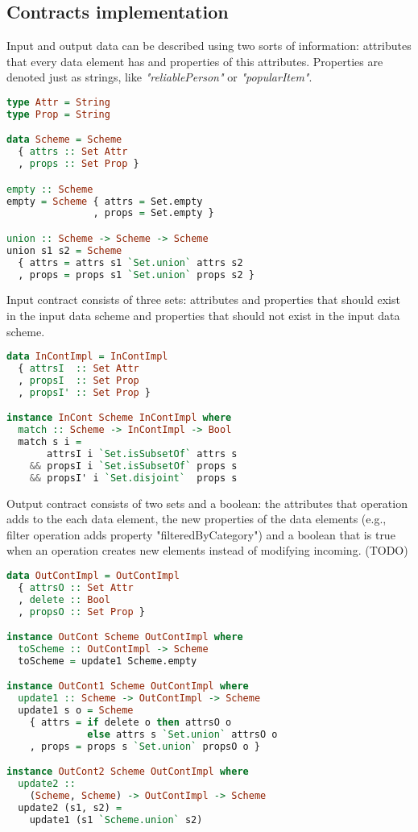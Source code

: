 \subsection{Contracts implementation}

Input and output data can be described using two sorts of information: attributes that every data element has and properties of this attributes.
Properties are denoted just as strings, like {\em "reliablePerson"} or {\em "popularItem"}.

\begin{lstlisting}[language=Haskell]
type Attr = String
type Prop = String

data Scheme = Scheme
  { attrs :: Set Attr
  , props :: Set Prop }

empty :: Scheme
empty = Scheme { attrs = Set.empty
               , props = Set.empty }

union :: Scheme -> Scheme -> Scheme
union s1 s2 = Scheme
  { attrs = attrs s1 `Set.union` attrs s2
  , props = props s1 `Set.union` props s2 }
\end{lstlisting}

Input contract consists of three sets: 
attributes and properties that should exist in the input data scheme
and properties that should not exist in the input data scheme.

\begin{lstlisting}[language=Haskell]
data InContImpl = InContImpl
  { attrsI  :: Set Attr
  , propsI  :: Set Prop
  , propsI' :: Set Prop }

instance InCont Scheme InContImpl where
  match :: Scheme -> InContImpl -> Bool
  match s i =
       attrsI i `Set.isSubsetOf` attrs s
    && propsI i `Set.isSubsetOf` props s
    && propsI' i `Set.disjoint`  props s
\end{lstlisting}

Output contract consists of two sets and a boolean: 
the attributes that operation adds to the each data element,
the new properties of the data elements (e.g., filter operation adds property "filteredByCategory")
and a boolean that is true when an operation creates new elements instead of modifying incoming. (TODO)

\begin{lstlisting}[language=Haskell]
data OutContImpl = OutContImpl
  { attrsO :: Set Attr
  , delete :: Bool
  , propsO :: Set Prop }

instance OutCont Scheme OutContImpl where
  toScheme :: OutContImpl -> Scheme
  toScheme = update1 Scheme.empty

instance OutCont1 Scheme OutContImpl where
  update1 :: Scheme -> OutContImpl -> Scheme
  update1 s o = Scheme
    { attrs = if delete o then attrsO o
              else attrs s `Set.union` attrsO o
    , props = props s `Set.union` propsO o }

instance OutCont2 Scheme OutContImpl where
  update2 :: 
    (Scheme, Scheme) -> OutContImpl -> Scheme
  update2 (s1, s2) = 
    update1 (s1 `Scheme.union` s2)
\end{lstlisting}

